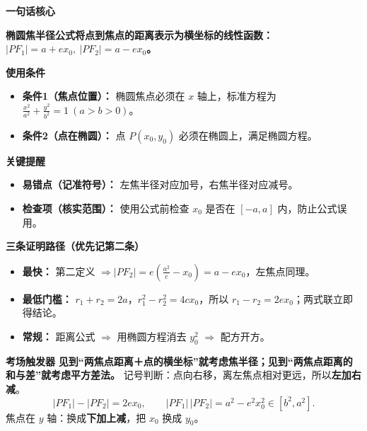 \begin{summarybox}
	\textbf{\textcolor{CSummary}{一句话核心}}

	\textbf{椭圆焦半径公式将点到焦点的距离表示为横坐标的线性函数：$|PF_1|=a+ex_0,\ |PF_2|=a-ex_0$。}

	\medskip
	\textbf{\textcolor{CSummary}{使用条件}}
	\begin{itemize}[leftmargin=*, itemsep=0.5em, topsep=0.4em]
		\item \textbf{条件1（焦点位置）：} 椭圆焦点必须在 $x$ 轴上，标准方程为 $\frac{x^2}{a^2}+\frac{y^2}{b^2}=1\ (a>b>0)$。
		\item \textbf{条件2（点在椭圆）：} 点 $P(x_0,y_0)$ 必须在椭圆上，满足椭圆方程。
	\end{itemize}

	\medskip
	\textbf{\textcolor{CSummary}{关键提醒}}
	\begin{itemize}[leftmargin=*, itemsep=0.5em, topsep=0.4em]
		\item \textbf{易错点（记准符号）：} 左焦半径对应加号，右焦半径对应减号。
		\item \textbf{检查项（核实范围）：} 使用公式前检查 $x_0$ 是否在 $[-a,a]$ 内，防止公式误用。
	\end{itemize}


\medskip
\textbf{\textcolor{CSummary}{三条证明路径（优先记第二条）}}
\begin{itemize}[leftmargin=*, itemsep=0.35em, topsep=0.3em]
 \item \textbf{最快：} 第二定义 $\Rightarrow |PF_2|=e(\frac{a^2}{c}-x_0)=a-ex_0$，左焦点同理。
 \item \textbf{最低门槛：} $r_1+r_2=2a$，$r_1^2-r_2^2=4cx_0$，所以 $r_1-r_2=2ex_0$；两式联立即得结论。
 \item \textbf{常规：} 距离公式 $\Rightarrow$ 用椭圆方程消去 $y_0^2$ $\Rightarrow$ 配方开方。
\end{itemize}

\medskip
\textbf{\textcolor{CSummary}{考场触发器}}
\textbf{见到“两焦点距离＋点的横坐标”就考虑焦半径；见到“两焦点距离的和与差”就考虑平方差法。}
记号判断：点向右移，离左焦点相对更远，所以\textbf{左加右减}。
\[
 \boxed{|PF_1|-|PF_2|=2ex_0},\qquad
 \boxed{|PF_1|\,|PF_2|=a^2-e^2x_0^2\in[b^2,a^2]}.
\]
焦点在 $y$ 轴：换成\textbf{下加上减}，把 $x_0$ 换成 $y_0$。
\end{summarybox}
